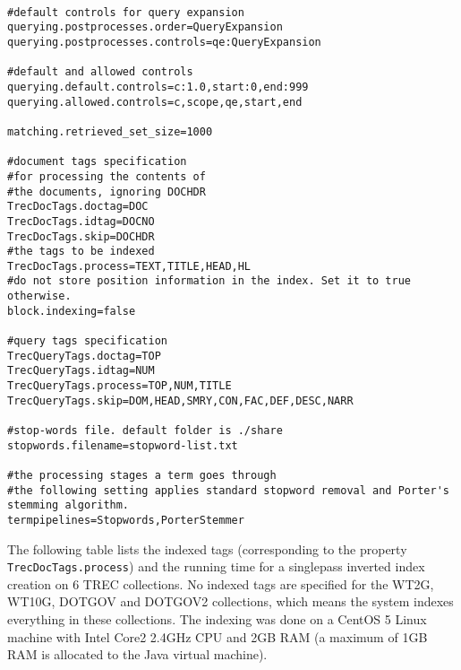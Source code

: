 \begin{verbatim}

#default controls for query expansion
querying.postprocesses.order=QueryExpansion
querying.postprocesses.controls=qe:QueryExpansion

#default and allowed controls
querying.default.controls=c:1.0,start:0,end:999
querying.allowed.controls=c,scope,qe,start,end

matching.retrieved_set_size=1000

#document tags specification
#for processing the contents of
#the documents, ignoring DOCHDR
TrecDocTags.doctag=DOC
TrecDocTags.idtag=DOCNO
TrecDocTags.skip=DOCHDR
#the tags to be indexed
TrecDocTags.process=TEXT,TITLE,HEAD,HL
#do not store position information in the index. Set it to true otherwise.
block.indexing=false

#query tags specification
TrecQueryTags.doctag=TOP
TrecQueryTags.idtag=NUM
TrecQueryTags.process=TOP,NUM,TITLE
TrecQueryTags.skip=DOM,HEAD,SMRY,CON,FAC,DEF,DESC,NARR

#stop-words file. default folder is ./share
stopwords.filename=stopword-list.txt

#the processing stages a term goes through
#the following setting applies standard stopword removal and Porter's stemming algorithm.
termpipelines=Stopwords,PorterStemmer
\end{verbatim}

The following table lists the indexed tags (corresponding to the
property \texttt{TrecDocTags.process}) and the running time for a
singlepass inverted index creation on 6 TREC collections. No indexed
tags are specified for the WT2G, WT10G, DOTGOV and DOTGOV2 collections,
which means the system indexes everything in these collections. The
indexing was done on a CentOS 5 Linux machine with Intel Core2 2.4GHz
CPU and 2GB RAM (a maximum of 1GB RAM is allocated to the Java virtual
machine).

